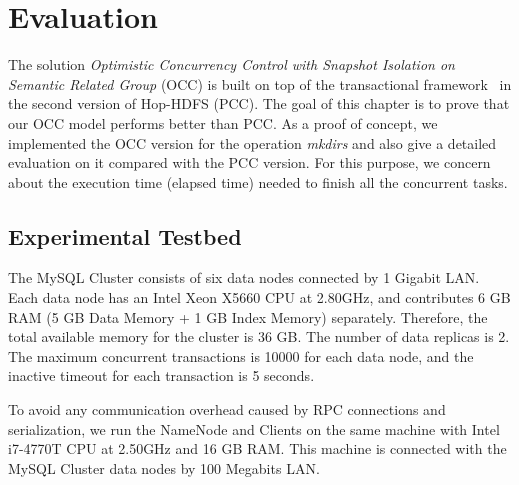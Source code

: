 
%
%


\chapter{Evaluation}
\label{ch:evaluation}

The solution \textit{Optimistic Concurrency Control with Snapshot Isolation on Semantic Related Group} (OCC) is built on top of the transactional framework~\cite{peiro2013maintaining} in the second version of Hop-HDFS (PCC). The goal of this chapter is to prove that our OCC model performs better than PCC. As a proof of concept, we implemented the OCC version for the operation \textit{mkdirs} and also give a detailed evaluation on it compared with the PCC version. For this purpose, we concern about the execution time (elapsed time) needed to finish all the concurrent tasks.

\section{Experimental Testbed}
\label{sec:testbed}

The MySQL Cluster consists of six data nodes connected by 1 Gigabit LAN. Each data node has an Intel Xeon X5660 CPU at 2.80GHz, and contributes 6 GB RAM (5 GB Data Memory + 1 GB Index Memory) separately. Therefore, the total available memory for the cluster is 36 GB. The number of data replicas is 2. The maximum concurrent transactions is 10000 for each data node, and the inactive timeout for each transaction is 5 seconds. 

\noindent To avoid any communication overhead caused by RPC connections and serialization, we run the NameNode and Clients on the same machine with Intel i7-4770T CPU at 2.50GHz and 16 GB RAM. This machine is connected with the MySQL Cluster data nodes by 100 Megabits LAN.


